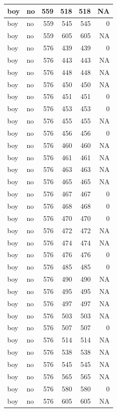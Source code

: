 \documentclass[man]{apa6}
\begin{document}
\begin{tabular}{l|l|r|r|r|r}
\hline
boy & no & 559 & 518 & 518 & NA\\
\hline
boy & no & 559 & 545 & 545 & 0\\
\hline
boy & no & 559 & 605 & 605 & NA\\
\hline
boy & no & 576 & 439 & 439 & 0\\
\hline
boy & no & 576 & 443 & 443 & NA\\
\hline
boy & no & 576 & 448 & 448 & NA\\
\hline
boy & no & 576 & 450 & 450 & NA\\
\hline
boy & no & 576 & 451 & 451 & 0\\
\hline
boy & no & 576 & 453 & 453 & 0\\
\hline
boy & no & 576 & 455 & 455 & NA\\
\hline
boy & no & 576 & 456 & 456 & 0\\
\hline
boy & no & 576 & 460 & 460 & NA\\
\hline
boy & no & 576 & 461 & 461 & NA\\
\hline
boy & no & 576 & 463 & 463 & NA\\
\hline
boy & no & 576 & 465 & 465 & NA\\
\hline
boy & no & 576 & 467 & 467 & 0\\
\hline
boy & no & 576 & 468 & 468 & 0\\
\hline
boy & no & 576 & 470 & 470 & 0\\
\hline
boy & no & 576 & 472 & 472 & NA\\
\hline
boy & no & 576 & 474 & 474 & NA\\
\hline
boy & no & 576 & 476 & 476 & 0\\
\hline
boy & no & 576 & 485 & 485 & 0\\
\hline
boy & no & 576 & 490 & 490 & NA\\
\hline
boy & no & 576 & 495 & 495 & NA\\
\hline
boy & no & 576 & 497 & 497 & NA\\
\hline
boy & no & 576 & 503 & 503 & NA\\
\hline
boy & no & 576 & 507 & 507 & 0\\
\hline
boy & no & 576 & 514 & 514 & NA\\
\hline
boy & no & 576 & 538 & 538 & NA\\
\hline
boy & no & 576 & 545 & 545 & NA\\
\hline
boy & no & 576 & 565 & 565 & NA\\
\hline
boy & no & 576 & 580 & 580 & 0\\
\hline
boy & no & 576 & 605 & 605 & NA\\

\end{tabular}
\end{document}
